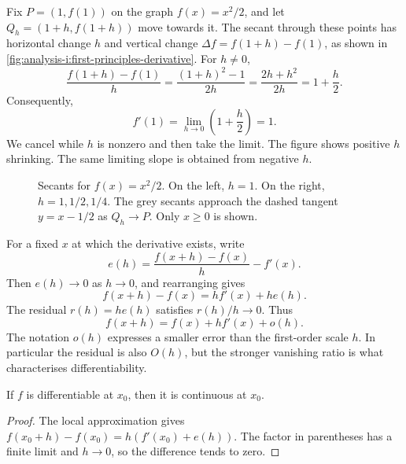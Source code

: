 \begin{example}
  Fix $P=(1,f(1))$ on the graph $f(x)=x^2/2$, and let
  $Q_h=(1+h,f(1+h))$ move towards it. The secant through these points
  has horizontal change $h$ and vertical change
  $\Delta f=f(1+h)-f(1)$, as shown in
  \autoref{fig:analysis-i:first-principles-derivative}. For $h\ne0$,
  \[
    \frac{f(1+h)-f(1)}h
      =\frac{(1+h)^2-1}{2h}
      =\frac{2h+h^2}{2h}=1+\frac h2.
  \]
  Consequently,
  \[
    f'(1)=\lim_{h\to0}\left(1+\frac h2\right)=1.
  \]
  We cancel while $h$ is nonzero and then take the limit. The figure
  shows positive $h$ shrinking. The same limiting slope is obtained
  from negative $h$.
\end{example}
\begin{figure}[htbp]
  \centering
  
  \caption[Secants approaching a tangent.]{Secants for
    $f(x)=x^2/2$. On the left, $h=1$. On the right, $h=1,1/2,1/4$. The grey
    secants approach the dashed tangent $y=x-1/2$ as $Q_h\to P$.
    Only $x\ge0$ is shown.}
  \label{fig:analysis-i:first-principles-derivative}
\end{figure}

For a fixed $x$ at which the derivative exists, write
\[
  e(h)=\frac{f(x+h)-f(x)}{h}-f'(x).
\]
Then $e(h)\to0$ as $h\to0$, and rearranging gives
\[
  f(x+h)-f(x)=h f'(x)+h e(h).
\]
The residual $r(h)=h e(h)$ satisfies $r(h)/h\to0$. Thus
\[
  f(x+h)=f(x)+h f'(x)+o(h).
\]
The notation $o(h)$ expresses a smaller error than the first-order scale
$h$. In particular the residual is also $O(h)$, but the stronger vanishing
ratio is what characterises differentiability.

\begin{proposition}
  \label{thm:analysis-i:differentiable-continuous}
  If $f$ is differentiable at $x_0$, then it is continuous at $x_0$.
\end{proposition}
\begin{proof}
  The local approximation gives
  $f(x_0+h)-f(x_0)=h(f'(x_0)+e(h))$. The factor in parentheses has a
  finite limit and $h\to0$, so the difference tends to zero.
\end{proof}

